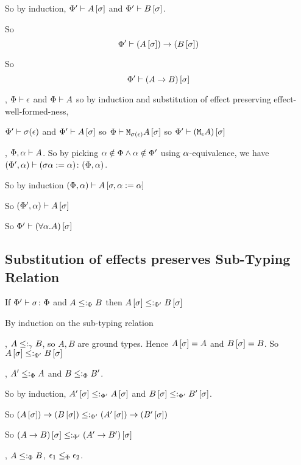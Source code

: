 {So by induction, $\Phi'\vdash A\left[\sigma\right]$ and $\Phi'\vdash B\left[\sigma\right]$.

So \begin{equation}
    \Phi'\vdash (A\left[\sigma\right])\rightarrow (B\left[\sigma\right])
\end{equation}

So \begin{equation}
    \Phi'\vdash (A\rightarrow B)\left[\sigma\right]
\end{equation}




\bi, $\Phi\vdash \epsilon$ and $\Phi\vdash A$ so by induction and substitution of effect preserving effect-well-formed-ness, 

$\Phi'\vdash \sigma(\epsilon)$ and $\Phi'\vdash A\left[\sigma\right]$ so $\Phi\vdash \texttt{M}_{\sigma(\epsilon)}{A\left[\sigma\right]}$ so $\Phi'\vdash (\texttt{M}_{\epsilon}{A})\left[\sigma\right]$

\bi, $\Phi,\alpha\vdash A$. So by picking $\alpha\notin\Phi\wedge\alpha\notin\Phi'$ using $\alpha$-equivalence, we have $(\Phi',\alpha) \vdash (\sigma\alpha:=\alpha) \colon (\Phi,\alpha)$.

So by induction $(\Phi, \alpha)\vdash A\left[\sigma,\alpha:=\alpha\right]$

So $(\Phi',\alpha)\vdash A\left[\sigma\right]$

So $\Phi'\vdash (\forall \alpha. A)\left[\sigma\right]$

\subsection{Substitution of effects preserves Sub-Typing Relation}

If $\Phi' \vdash \sigma \colon \Phi$ and $A\leq:_\Phi B$ then $A\left[\sigma\right]\leq:_{\Phi'} B\left[\sigma\right]$

\proof
By induction on the sub-typing relation

\bi, $A\leq:_\gamma B$, so $A, B$ are ground types.
Hence $A\left[\sigma\right] = A$ and $B\left[\sigma\right] = B$.
So $A\left[\sigma\right]\leq:_{\Phi'} B\left[\sigma\right]$

\bi, $A'\leq:_\Phi A$ and $B\leq:_\Phi B'$.

So by induction, $A'\left[\sigma\right]\leq:_{\Phi'} A\left[\sigma\right]$ and $B\left[\sigma\right]\leq:_{\Phi'} B'\left[\sigma\right]$.

So $(A\left[\sigma\right])\rightarrow (B\left[\sigma\right])\leq:_{\Phi'} (A'\left[\sigma\right])\rightarrow (B'\left[\sigma\right])$

So $(A\rightarrow B)\left[\sigma\right]\leq:_{\Phi'} (A'\rightarrow B')\left[\sigma\right]$


\bi, $A\leq:_\Phi B$, $\epsilon_1\leq_{\Phi}\epsilon_2$.

}
